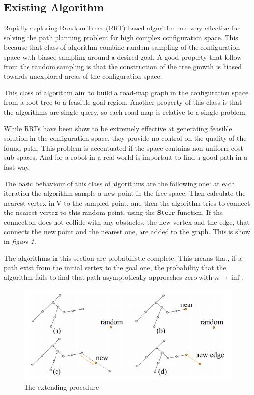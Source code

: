 \documentclass[10pt]{article}
\begin{document}
	\subsection{Existing Algorithm}

	Rapidly-exploring Random Trees (RRT) based algorithm are very effective for solving the path planning problem for high complex configuration space. This because that class of algorithm combine random sampling of the configuration space with biased sampling around a desired goal. A good property that follow from the random sampling is that the construction of the tree growth is biased towards unexplored areas of the configuration space.
	
	This class of algorithm aim to build a road-map graph in the configuration space from a root tree to a feasible goal region. Another property of this class is that the algorithms are single query, so each road-map is relative to a single problem. 
	
	While RRTs have been show to be extremely effective at generating feasible solution in the configuration space, they provide no control on the quality of the found path. This problem is accentuated if the space contains non uniform cost sub-spaces. And for a robot in a real world is important to find a good path in a fast way.
	
	The basic behaviour of this class of algorithms are the following one: at each iteration the algorithm  sample a new point in the free space. Then calculate the nearest vertex in V to the sampled point, and then the algorithm tries to connect the nearest vertex to this random point, using the \textbf{Steer} function. If the connection does not collide with any obstacles, the new vertex and the edge, that connects the new point and the nearest one, are added to the graph. This is show in \textit{figure 1}.
	
		
	The algorithms in this section are probabilistic complete. This means that, if a path exist from the initial vertex to the goal one, the probability that the algorithm fails to find that path asymptotically approaches zero with $n \rightarrow \inf$. 
	
	
	\FloatBarrier
	\begin{figure}[bht]
		\centering
		\includegraphics[width=0.8\linewidth]{rrtExt.png}
		\caption{The extending procedure}
	\end{figure}
\FloatBarrier
\end{document}
